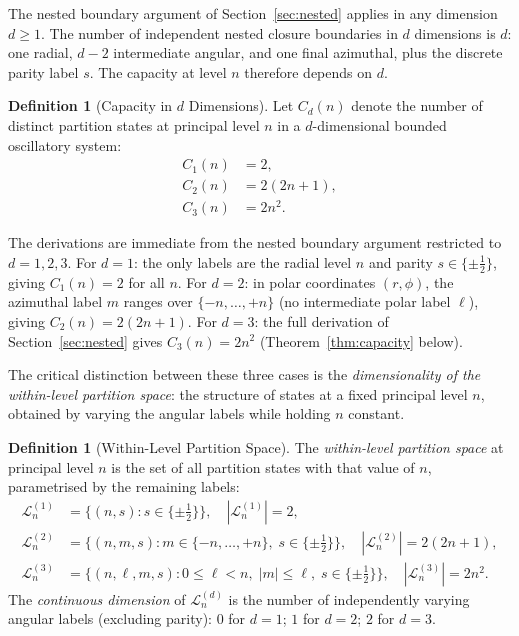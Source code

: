 \documentclass[twocolumn,10pt,a4paper]{article}
\theoremstyle{thmstyle}
\theoremstyle{definition}
\newtheorem{definition}[theorem]{Definition}
\theoremstyle{remark}
\begin{document}
The nested boundary argument of Section~\ref{sec:nested} applies in any dimension $d \geq 1$. The number of independent nested closure boundaries in $d$ dimensions is $d$: one radial, $d-2$ intermediate angular, and one final azimuthal, plus the discrete parity label $s$. The capacity at level $n$ therefore depends on $d$.

\begin{definition}[Capacity in $d$ Dimensions]
\label{def:cap-d}
Let $C_d(n)$ denote the number of distinct partition states at principal level $n$ in a $d$-dimensional bounded oscillatory system:
\begin{align}
    C_1(n) &= 2, \label{eq:c1} \\
    C_2(n) &= 2(2n+1), \label{eq:c2} \\
    C_3(n) &= 2n^2. \label{eq:c3}
\end{align}
\end{definition}

The derivations are immediate from the nested boundary argument restricted to $d = 1, 2, 3$. For $d = 1$: the only labels are the radial level $n$ and parity $s \in \{\pm\tfrac{1}{2}\}$, giving $C_1(n) = 2$ for all $n$. For $d = 2$: in polar coordinates $(r, \phi)$, the azimuthal label $m$ ranges over $\{-n, \ldots, +n\}$ (no intermediate polar label $\ell$), giving $C_2(n) = 2(2n+1)$. For $d = 3$: the full derivation of Section~\ref{sec:nested} gives $C_3(n) = 2n^2$ (Theorem~\ref{thm:capacity} below).

The critical distinction between these three cases is the \emph{dimensionality of the within-level partition space}: the structure of states at a fixed principal level $n$, obtained by varying the angular labels while holding $n$ constant.

\begin{definition}[Within-Level Partition Space]
\label{def:within-level}
The \emph{within-level partition space} at principal level $n$ is the set of all partition states with that value of $n$, parametrised by the remaining labels:
\begin{align}
    \mathcal{L}_n^{(1)} &= \bigl\{(n, s) : s \in \{{\pm\tfrac{1}{2}}\}\bigr\}, \quad |\mathcal{L}_n^{(1)}| = 2, \\
    \mathcal{L}_n^{(2)} &= \bigl\{(n, m, s) : m \in \{-n,\ldots,+n\},\; s \in \{{\pm\tfrac{1}{2}}\}\bigr\}, \quad |\mathcal{L}_n^{(2)}| = 2(2n+1), \\
    \mathcal{L}_n^{(3)} &= \bigl\{(n, \ell, m, s) : 0 \leq \ell < n,\; |m| \leq \ell,\; s \in \{{\pm\tfrac{1}{2}}\}\bigr\}, \quad |\mathcal{L}_n^{(3)}| = 2n^2.
\end{align}
The \emph{continuous dimension} of $\mathcal{L}_n^{(d)}$ is the number of independently varying angular labels (excluding parity): $0$ for $d = 1$; $1$ for $d = 2$; $2$ for $d = 3$.
\end{definition}
\end{document}
